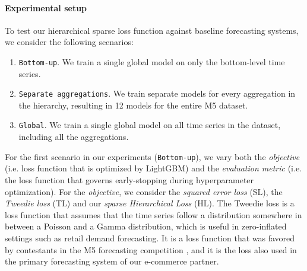 \documentclass[preprint, 3p, times, twocolumn]{elsarticle}
\begin{document}
  \paragraph{Experimental setup} To test our hierarchical sparse loss function against baseline forecasting systems, we consider the following scenarios:
  \begin{enumerate}
    \item \texttt{Bottom-up}. We train a single global model on only the bottom-level time series.
    \item \texttt{Separate aggregations}. We train separate models for every aggregation in the hierarchy, resulting in 12 models for the entire M5 dataset.
    \item \texttt{Global}. We train a single global model on all time series in the dataset, including all the aggregations.
  \end{enumerate}
  For the first scenario in our experiments (\texttt{Bottom-up}), we vary both the \textit{objective} (i.e. loss function that is optimized by LightGBM) and the \textit{evaluation metric} (i.e. the loss function that governs early-stopping during hyperparameter optimization). For the \textit{objective}, we consider the \textit{squared error loss} (SL), the \textit{Tweedie loss} (TL) and our \textit{sparse Hierarchical Loss} (HL). The Tweedie loss is a loss function that assumes that the time series follow a distribution somewhere in between a Poisson and a Gamma distribution, which is useful in zero-inflated settings such as retail demand forecasting. It is a loss function that was favored by contestants in the M5 forecasting competition \cite{januschowski_forecasting_2022}, and it is the loss also used in the primary forecasting system of our e-commerce partner.
\end{document}
